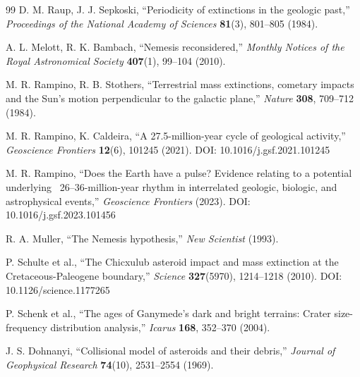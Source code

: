 \documentclass[11pt,a4paper]{article}
\begin{document}
	\begin{thebibliography}{99}
		D. M. Raup, J. J. Sepkoski, ``Periodicity of extinctions in the geologic past,''
		\emph{Proceedings of the National Academy of Sciences} \textbf{81}(3), 801–805 (1984).
		
		A. L. Melott, R. K. Bambach, ``Nemesis reconsidered,''
		\emph{Monthly Notices of the Royal Astronomical Society} \textbf{407}(1), 99–104 (2010).
		
		M. R. Rampino, R. B. Stothers, ``Terrestrial mass extinctions, cometary impacts and the Sun's motion perpendicular to the galactic plane,''
		\emph{Nature} \textbf{308}, 709–712 (1984).
		
		M. R. Rampino, K. Caldeira, ``A 27.5-million-year cycle of geological activity,''
		\emph{Geoscience Frontiers} \textbf{12}(6), 101245 (2021). DOI: 10.1016/j.gsf.2021.101245
		
		M. R. Rampino, ``Does the Earth have a pulse? Evidence relating to a potential underlying ~26–36-million-year rhythm in interrelated geologic, biologic, and astrophysical events,''
		\emph{Geoscience Frontiers} (2023). DOI: 10.1016/j.gsf.2023.101456
		
		R. A. Muller, ``The Nemesis hypothesis,''
		\emph{New Scientist} (1993).
		
		P. Schulte et al., ``The Chicxulub asteroid impact and mass extinction at the Cretaceous-Paleogene boundary,''
		\emph{Science} \textbf{327}(5970), 1214–1218 (2010). DOI: 10.1126/science.1177265
		
		P. Schenk et al., ``The ages of Ganymede's dark and bright terrains: Crater size-frequency distribution analysis,''
		\emph{Icarus} \textbf{168}, 352–370 (2004).
		
		J. S. Dohnanyi, ``Collisional model of asteroids and their debris,''
		\emph{Journal of Geophysical Research} \textbf{74}(10), 2531–2554 (1969).
		

\end{thebibliography}
\end{document}
